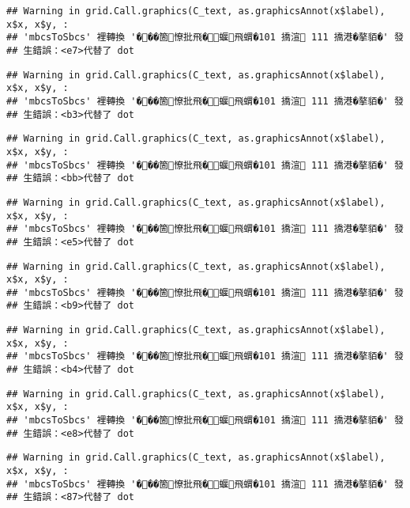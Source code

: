 \documentclass[
]{article}
\begin{document}
\begin{verbatim}
## Warning in grid.Call.graphics(C_text, as.graphicsAnnot(x$label), x$x, x$y, :
## 'mbcsToSbcs' 裡轉換 '���箇憭批飛�蝘飛蝟�101 撟渲 111 撟港�摮貊�' 發
## 生錯誤：<e7>代替了 dot
\end{verbatim}

\begin{verbatim}
## Warning in grid.Call.graphics(C_text, as.graphicsAnnot(x$label), x$x, x$y, :
## 'mbcsToSbcs' 裡轉換 '���箇憭批飛�蝘飛蝟�101 撟渲 111 撟港�摮貊�' 發
## 生錯誤：<b3>代替了 dot
\end{verbatim}

\begin{verbatim}
## Warning in grid.Call.graphics(C_text, as.graphicsAnnot(x$label), x$x, x$y, :
## 'mbcsToSbcs' 裡轉換 '���箇憭批飛�蝘飛蝟�101 撟渲 111 撟港�摮貊�' 發
## 生錯誤：<bb>代替了 dot
\end{verbatim}

\begin{verbatim}
## Warning in grid.Call.graphics(C_text, as.graphicsAnnot(x$label), x$x, x$y, :
## 'mbcsToSbcs' 裡轉換 '���箇憭批飛�蝘飛蝟�101 撟渲 111 撟港�摮貊�' 發
## 生錯誤：<e5>代替了 dot
\end{verbatim}

\begin{verbatim}
## Warning in grid.Call.graphics(C_text, as.graphicsAnnot(x$label), x$x, x$y, :
## 'mbcsToSbcs' 裡轉換 '���箇憭批飛�蝘飛蝟�101 撟渲 111 撟港�摮貊�' 發
## 生錯誤：<b9>代替了 dot
\end{verbatim}

\begin{verbatim}
## Warning in grid.Call.graphics(C_text, as.graphicsAnnot(x$label), x$x, x$y, :
## 'mbcsToSbcs' 裡轉換 '���箇憭批飛�蝘飛蝟�101 撟渲 111 撟港�摮貊�' 發
## 生錯誤：<b4>代替了 dot
\end{verbatim}

\begin{verbatim}
## Warning in grid.Call.graphics(C_text, as.graphicsAnnot(x$label), x$x, x$y, :
## 'mbcsToSbcs' 裡轉換 '���箇憭批飛�蝘飛蝟�101 撟渲 111 撟港�摮貊�' 發
## 生錯誤：<e8>代替了 dot
\end{verbatim}

\begin{verbatim}
## Warning in grid.Call.graphics(C_text, as.graphicsAnnot(x$label), x$x, x$y, :
## 'mbcsToSbcs' 裡轉換 '���箇憭批飛�蝘飛蝟�101 撟渲 111 撟港�摮貊�' 發
## 生錯誤：<87>代替了 dot
\end{verbatim}
\end{document}
